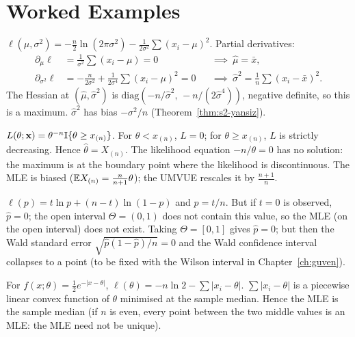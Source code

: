 \documentclass[main.tex]{subfiles}
\begin{document}
\section{Worked Examples}

\begin{example}\label{ex:normal-mle}
$\ell(\mu,\sigma^2)=-\frac n2\ln(2\pi\sigma^2)-\frac{1}{2\sigma^2}\sum(x_i-\mu)^2$. Partial derivatives:
\begin{align*}
\partial_\mu\ell&=\frac{1}{\sigma^2}\sum(x_i-\mu)=0 &&\implies\ \hat\mu=\bar x,\\
\partial_{\sigma^2}\ell&=-\frac{n}{2\sigma^2}+\frac{1}{2\sigma^4}\sum(x_i-\mu)^2=0 &&\implies\ \hat\sigma^2=\frac1n\sum(x_i-\bar x)^2 .
\end{align*}
The Hessian at $(\hat\mu,\hat\sigma^2)$ is $\mathrm{diag}(-n/\hat\sigma^2,\,-n/(2\hat\sigma^4))$, negative definite, so this is a maximum. $\hat\sigma^2$ has bias $-\sigma^2/n$ (Theorem~\ref{thm:s2-yansiz}).
\end{example}

\begin{example}\label{ex:uniform-mle}
$L(\theta;\mathbf{x})=\theta^{-n}\mathbb{I}\{\theta\ge x_{(n)}\}$. For $\theta<x_{(n)}$, $L=0$; for $\theta\ge x_{(n)}$, $L$ is strictly decreasing. Hence $\hat\theta=X_{(n)}$. The likelihood equation $-n/\theta=0$ has no solution: the maximum is at the boundary point where the likelihood is discontinuous. The MLE is biased ($\mathbb{E} X_{(n)}=\frac{n}{n+1}\theta$); the UMVUE rescales it by $\frac{n+1}{n}$.
\end{example}

\begin{example}
$\ell(p)=t\ln p+(n-t)\ln(1-p)$ and $\hat p=t/n$. But if $t=0$ is observed, $\hat p=0$; the open interval $\Theta=(0,1)$ does not contain this value, so the MLE (on the open interval) does not exist. Taking $\Theta=[0,1]$ gives $\hat p=0$; but then the Wald standard error $\sqrt{\hat p(1-\hat p)/n}=0$ and the Wald confidence interval collapses to a point (to be fixed with the Wilson interval in Chapter~\ref{ch:guven}).
\end{example}

\begin{example}
For $f(x;\theta)=\frac12e^{-|x-\theta|}$, $\ell(\theta)=-n\ln2-\sum|x_i-\theta|$. $\sum|x_i-\theta|$ is a piecewise linear convex function of $\theta$ minimised at the sample median. Hence the MLE is the sample median (if $n$ is even, every point between the two middle values is an MLE: the MLE need not be unique).
\end{example}
\end{document}
